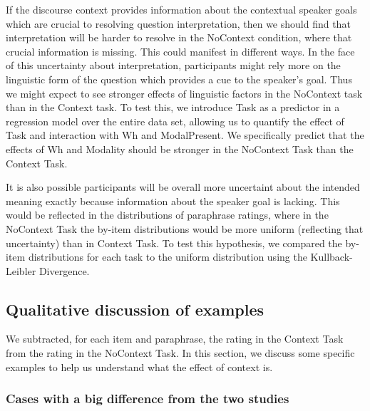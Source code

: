 \documentclass[12pt,letterpaper,table,svgnames,dvipsnames]{article}
\begin{document}
If the discourse context provides information about the contextual speaker goals which are crucial to resolving question interpretation, then we should find that interpretation will be harder to resolve in the NoContext condition, where that crucial information is missing. This could manifest in different ways. In the face of this uncertainty about interpretation, participants might rely more on the linguistic form of the question which provides a cue to the speaker's goal. Thus we might expect to see stronger effects of linguistic factors in the NoContext task than in the Context task. To test this, we introduce Task as a predictor in a regression model over the entire data set, allowing us to quantify the effect of Task and interaction with Wh and ModalPresent. We specifically predict that the effects of Wh and Modality should be stronger in the NoContext Task than the Context Task.

It is also possible participants will be overall more uncertaint about the intended meaning exactly because information about the speaker goal is lacking. This would be reflected in the distributions of paraphrase ratings, where in the NoContext Task the  by-item distributions would be more uniform (reflecting that uncertainty) than in Context Task. To test this hypothesis, we compared the by-item distributions for each task to the uniform distribution using the Kullback-Leibler Divergence.



\subsection{Qualitative discussion of examples}

We subtracted, for each item and paraphrase, the rating in the Context Task from the rating in the NoContext Task. In this section, we discuss some specific examples to help us understand what the effect of context is. 


\subsubsection{Cases with a big difference from the two studies}
\end{document}
